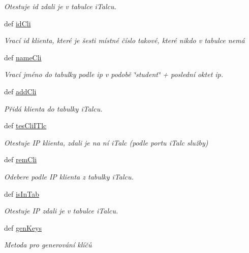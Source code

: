 \begin{DoxyCompactItemize}
\begin{DoxyCompactList}\small\item\em Otestuje id zdali je v tabulce i\-Talcu. \end{DoxyCompactList}\item 
def \hyperlink{classiTaHand_1_1iTaHand_a459374694fb9800430a1853628e24c41}{id\-Cli}
\begin{DoxyCompactList}\small\item\em Vrací id klienta, které je šesti místné číslo takové, které nikdo v tabulce nemá \end{DoxyCompactList}\item 
def \hyperlink{classiTaHand_1_1iTaHand_af799d8a13b0a18f4d433056696db2b39}{name\-Cli}
\begin{DoxyCompactList}\small\item\em Vrací jméno do tabulky podle ip v podobě \char`\"{}student\char`\"{} + poslední oktet ip. \end{DoxyCompactList}\item 
def \hyperlink{classiTaHand_1_1iTaHand_a9da48b15e52ef32a22d8ea4ae858ee2f}{add\-Cli}
\begin{DoxyCompactList}\small\item\em Přidá klienta do tabulky i\-Talcu. \end{DoxyCompactList}\item 
def \hyperlink{classiTaHand_1_1iTaHand_a0480dcab0430983cbd44d96c36a96dbf}{tes\-Cli\-I\-Tlc}
\begin{DoxyCompactList}\small\item\em Otestuje I\-P klienta, zdali je na ní i\-Talc (podle portu i\-Talc služby) \end{DoxyCompactList}\item 
def \hyperlink{classiTaHand_1_1iTaHand_aa85e732c76956f9c18f3feba1898d212}{rem\-Cli}
\begin{DoxyCompactList}\small\item\em Odebere podle I\-P klienta z tabulky i\-Talcu. \end{DoxyCompactList}\item 
def \hyperlink{classiTaHand_1_1iTaHand_a6bed964bd89db11b0a8907c683b80572}{is\-In\-Tab}
\begin{DoxyCompactList}\small\item\em Otestuje I\-P zdali je v tabulce i\-Talcu. \end{DoxyCompactList}\item 
def \hyperlink{classiTaHand_1_1iTaHand_a2a1132b32b4bcce6b8410317fa2c678f}{gen\-Keys}
\begin{DoxyCompactList}\small\item\em Metoda pro generování klíčů \end{DoxyCompactList}\item 

\end{DoxyCompactItemize}
